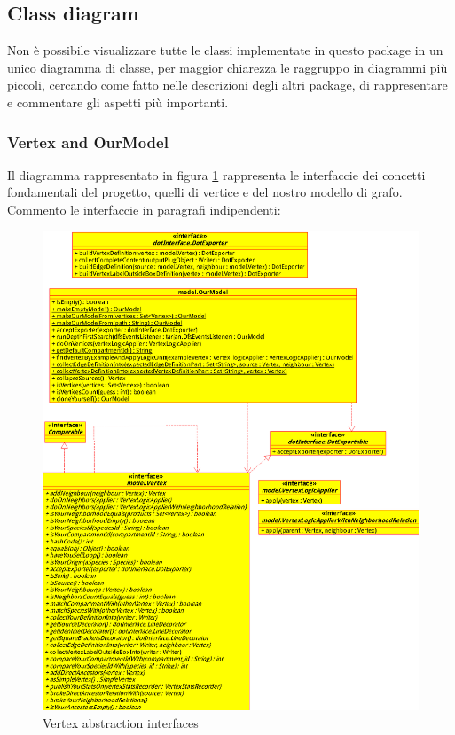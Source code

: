 \subsection{Class diagram}

Non \`e possibile visualizzare tutte le classi implementate in questo
package in un unico diagramma di classe, per maggior chiarezza le
raggruppo in diagrammi pi\`u piccoli, cercando come fatto nelle
descrizioni degli altri package, di rappresentare e commentare gli
aspetti pi\`u importanti.

\subsubsection{Vertex and OurModel}
Il diagramma rappresentato in figura
\ref{fig:vertex-abstraction-interfaces} rappresenta le interfaccie
dei concetti fondamentali del progetto, quelli di vertice e del nostro
modello di grafo. Commento le interfaccie in paragrafi indipendenti:

\begin{figure}
  \centering
  \includegraphics{packages/vertex-interface-class-diagram.eps}
  \caption{Vertex abstraction interfaces}
  \label{fig:vertex-abstraction-interfaces}
\end{figure}

